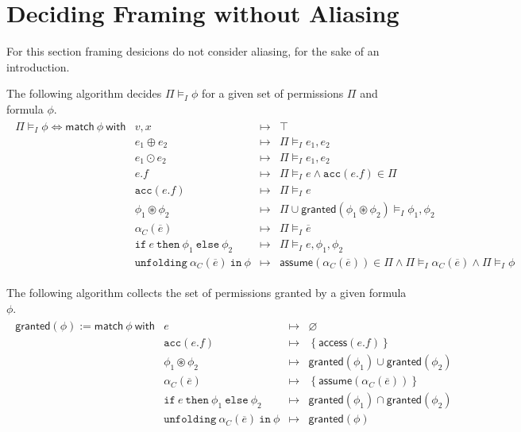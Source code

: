 \documentclass{article}
\newcommand{\tsf}{\textsf}
\newcommand{\ttt}{\texttt}
\newcommand{\access}{\tsf{access}}
\newcommand{\assume}{\tsf{assume}}
\newcommand{\frames}{\vDash_I}
\newcommand{\mt}{\mapsto}
\newcommand{\set}[1]{\left\{ #1 \right\}}
\newcommand{\cast}{\circledast}
\renewcommand{\vec}{\overline}
\renewcommand{\empty}{\varnothing}
\newcommand{\cif}{\ttt{if}}
\newcommand{\cthen}{\ttt{then}}
\newcommand{\celse}{\ttt{else}}
\newcommand{\cacc}{\ttt{acc}}
\newcommand{\cunfolding}{\ttt{unfolding}}
\newcommand{\cin}{\ttt{in}}
\newcommand{\granted}{\tsf{granted}}
\begin{document}
\section{Deciding Framing without Aliasing}

For this section framing desicions do not consider aliasing, for the sake of an introduction.

\noindent
The following algorithm decides $\Pi \frames \phi$ for a given set of permissions $\Pi$ and formula $\phi$.
\begin{align*}
\begin{array}{r|lrl}
\Pi \frames \phi
\iff \tsf{match} \ \phi \ \tsf{with}
%
%
& v, x                &\mt& \top
\\
& e_1 \oplus e_2      &\mt& \Pi \frames e_1, e_2
\\
& e_1 \odot e_2       &\mt& \Pi \frames e_1, e_2
\\
& e.f                 &\mt& \Pi \frames e
                      \land \cacc(e.f) \in \Pi
\\
%
& \cacc(e.f)          &\mt& \Pi \frames e
\\
& \phi_1 \cast \phi_2 &\mt& \Pi \cup \tsf{granted}(\phi_1 \cast \phi_2) \frames \phi_1, \phi_2
\\
& \alpha_C(\vec{e})   &\mt& \Pi \frames \vec{e}
\\
& \cif \ e \ \cthen \ \phi_1 \ \celse \ \phi_2
                      &\mt& \Pi \frames e, \phi_1, \phi_2
\\
& \cunfolding \ \alpha_C(\vec{e}) \ \cin \ \phi
                      &\mt& \assume(\alpha_C(\vec{e})) \in \Pi
                      \land \Pi \frames \alpha_C(\vec{e})
                      \land \Pi \frames \phi
\end{array}
\end{align*}

\noindent
The following algorithm collects the set of permissions granted by a given formula $\phi$.
\begin{align*}
\begin{array}{r|lrl}
\granted(\phi)
:= \tsf{match} \ \phi \ \tsf{with}
%
%
& e                   &\mt& \empty \\
%
%
& \cacc(e.f)          &\mt& \set{ \access(e.f) }
\\
& \phi_1 \cast \phi_2 &\mt& \granted(\phi_1)
                      \cup  \granted(\phi_2)
\\
& \alpha_C(\vec{e})   &\mt& \set{ \assume(\alpha_C(\vec{e})) }
\\
& \cif \ e \ \cthen \ \phi_1 \ \celse \ \phi_2
                      &\mt& \granted(\phi_1) \cap \granted(\phi_2)
\\
& \cunfolding \ \alpha_C(\vec{e}) \ \cin \ \phi
                      &\mt& \granted(\phi)
\end{array}
\end{align*}
\end{document}
